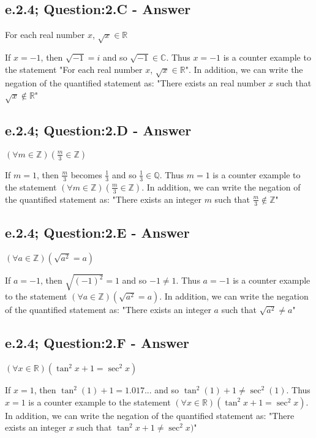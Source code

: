 \subsection{e.2.4; Question:2.C - Answer}
	\begin{center}
		For each real number $x$, $\sqrt{x} \in \mathbb{R}$
	\end{center}
If $x = -1$, then $\sqrt{-1} = i$ and so $\sqrt{-1} \in \mathbb{C}$. Thus  $x = -1$ is a counter example to the statement "For each real number $x$, $\sqrt{x} \in \mathbb{R}$". In addition, we can write the negation of the quantified statement as: "There exists an real number $x$ such that $\sqrt{x} \notin \mathbb{R}$"


\subsection{e.2.4; Question:2.D - Answer}
	\begin{center}
		$(\forall m \in \mathbb{Z})(\frac{m}{3} \in \mathbb{Z})$
	\end{center}
If $m = 1$, then $\frac{m}{3}$ becomes $\frac{1}{3}$ and so $\frac{1}{3} \in \mathbb{Q}$. Thus  $m = 1$ is a counter example to the statement $(\forall m \in \mathbb{Z})(\frac{m}{3} \in \mathbb{Z})$. In addition, we can write the negation of the quantified statement as: "There exists an integer $m$ such that $\frac{m}{3} \notin \mathbb{Z}$"


\subsection{e.2.4; Question:2.E - Answer}
	\begin{center}
		$(\forall a \in \mathbb{Z})(\sqrt{a^2} = a)$
	\end{center}
If $a = -1$, then $\sqrt{(-1)^2} = 1$ and so $-1 \neq 1$. Thus  $a = -1$ is a counter example to the statement $(\forall a \in \mathbb{Z})(\sqrt{a^2} = a)$. In addition, we can write the negation of the quantified statement as: "There exists an integer $a$ such that $\sqrt{a^2} \neq a$"


\subsection{e.2.4; Question:2.F - Answer}
	\begin{center}
		$(\forall x \in \mathbb{R})(\tan^2 x + 1 = \sec^2 x)$
	\end{center}
If $x = 1$, then $\tan^2 (1) + 1 = 1.017...$ and so $\tan^2 (1) + 1 \neq \sec^2 (1)$. Thus  $x = 1$ is a counter example to the statement $(\forall x \in \mathbb{R})(\tan^2 x + 1 = \sec^2 x)$. In addition, we can write the negation of the quantified statement as: "There exists an integer $x$ such that $\tan^2 x + 1 \neq \sec^2 x)$"


